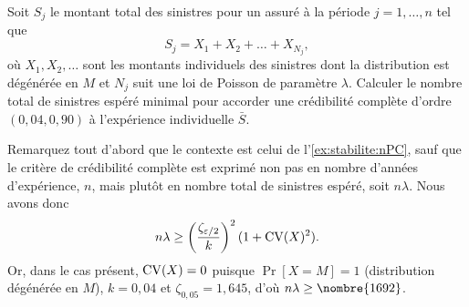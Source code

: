 \begin{exercice}
  Soit $S_j$ le montant total des sinistres pour un assuré à la
  période $j = 1, \dots, n$ tel que
  \begin{displaymath}
    S_j = X_1 + X_2 + \dots + X_{N_j},
  \end{displaymath}
  où $X_1, X_2, \dots$ sont les montants individuels des sinistres
  dont la distribution est dégénérée en $M$ et $N_j$ suit une loi de
  Poisson de paramètre $\lambda$. Calculer le nombre total de
  sinistres espéré minimal pour accorder une crédibilité complète
  d'ordre $(0,04, 0,90)$ à l'expérience individuelle $\bar{S}$.
  \begin{rep}
  \end{rep}
  \begin{sol}
    Remarquez tout d'abord que le contexte est celui de
    l'\autoref{ex:stabilite:nPC}, sauf que le critère de crédibilité
    complète est exprimé non pas en nombre d'années d'expérience, $n$,
    mais plutôt en nombre total de sinistres espéré, soit $n \lambda$.
    Nous avons donc
    \begin{displaymath}
      n \lambda \geq
      \left(
        \frac{\zeta_{\varepsilon/2}}{k}
      \right)^2
      (1 + \operatorname{CV}(X)^2).
    \end{displaymath}
    Or, dans le cas présent, $\operatorname{CV}(X) = 0$ puisque $\Pr[X = M]
    = 1$ (distribution dégénérée en $M$), $k = 0,04$ et $\zeta_{0,05}
    = 1,645$, d'où $n \lambda \geq \nombre{1692}$.
  \end{sol}
\end{exercice}


